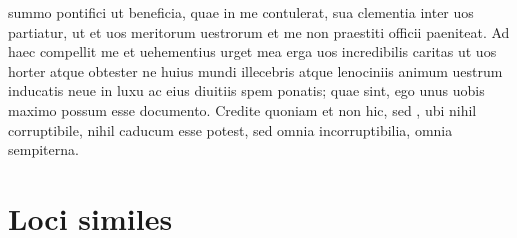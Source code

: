 \documentclass[a5paper,twoside]{article}
\begin{document}
 summo pontifici ut beneficia, quae in me contulerat, sua clementia inter uos partiatur, ut et uos meritorum uestrorum et me non praestiti officii  paeniteat.  Ad haec compellit me et uehementius urget mea erga uos incredibilis caritas ut uos horter atque obtester ne huius mundi illecebris atque lenociniis animum uestrum inducatis neue in luxu ac  eius diuitiis spem  ponatis; quae  sint, ego unus uobis maximo possum esse documento.  Credite quoniam  et non hic, sed , ubi nihil corruptibile, nihil caducum esse potest, sed omnia incorruptibilia, omnia sempiterna.

\endnumbering

\newpage

\section*{Loci similes}
\end{document}
